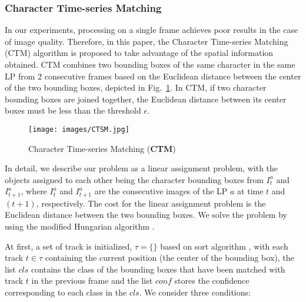 \documentclass[conference]{IEEEtran}
\begin{document}
\subsubsection{Character Time-series Matching}\label{SCM}












In our experiments, processing on a single frame achieves poor results in the case of image quality. Therefore, in this paper, the Character Time-series Matching (CTM) algorithm is proposed to take advantage of the spatial information obtained. CTM combines two bounding boxes of the same character in the same LP from 2 consecutive frames based on the Euclidean distance between the center of the two bounding boxes, depicted in Fig.~\ref{ctsm}.  
In CTM, if two character bounding boxes are joined together, the Euclidean distance between its center boxes  must be less than the threshold $\epsilon$.




\begin{figure}[htp]
  \centering
    \texttt{[image: images/CTSM.jpg]}
  \caption{Character Time-series Matching (\textbf{CTM})}
  \label{ctsm}
\end{figure}
In detail, we describe our problem as a linear assignment problem, with the objects assigned to each other being the character bounding boxes from $I^{a}_{t}$ and $I^{a}_{t+1}$, where $I^{a}_{t}$ and $I^{a}_{t+1}$ are the consecutive images of the LP $a$ at time $t$ and $(t+1)$, respectively. The cost for the linear assignment problem is the Euclidean distance between the two bounding boxes. We solve the problem by using the modified Hungarian algorithm \cite{hungarian}. 

At first, a set of track is initialized, $\tau =\{\}$ based on sort algorithm \cite{sort}, with each track $t \in \tau$ containing the current position (the center of the bounding box), the list $cls$ contains the class of the bounding boxes that have been matched with track $t$ in the previous frame and the list $conf$ stores the confidence corresponding to each class in the $cls$.
We consider three conditions:
\end{document}
